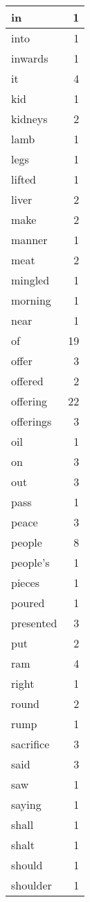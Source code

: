 \begin{center}
\begin{longtable}{l|r}
in & 1 \\ \hline
into & 1 \\ \hline
inwards & 1 \\ \hline
it & 4 \\ \hline
kid & 1 \\ \hline
kidneys & 2 \\ \hline
lamb & 1 \\ \hline
legs & 1 \\ \hline
lifted & 1 \\ \hline
liver & 2 \\ \hline
make & 2 \\ \hline
manner & 1 \\ \hline
meat & 2 \\ \hline
mingled & 1 \\ \hline
morning & 1 \\ \hline
near & 1 \\ \hline
of & 19 \\ \hline
offer & 3 \\ \hline
offered & 2 \\ \hline
offering & 22 \\ \hline
offerings & 3 \\ \hline
oil & 1 \\ \hline
on & 3 \\ \hline
out & 3 \\ \hline
pass & 1 \\ \hline
peace & 3 \\ \hline
people & 8 \\ \hline
people's & 1 \\ \hline
pieces & 1 \\ \hline
poured & 1 \\ \hline
presented & 3 \\ \hline
put & 2 \\ \hline
ram & 4 \\ \hline
right & 1 \\ \hline
round & 2 \\ \hline
rump & 1 \\ \hline
sacrifice & 3 \\ \hline
said & 3 \\ \hline
saw & 1 \\ \hline
saying & 1 \\ \hline
shall & 1 \\ \hline
shalt & 1 \\ \hline
should & 1 \\ \hline
shoulder & 1 \\ \hline

\end{longtable}
\end{center}
